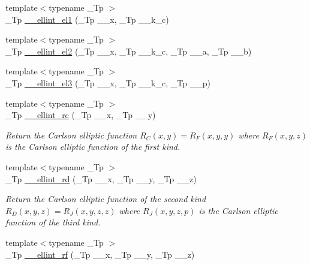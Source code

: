\begin{DoxyCompactItemize}
\item 
{\footnotesize template$<$typename \+\_\+\+Tp $>$ }\\\+\_\+\+Tp \hyperlink{namespacestd_1_1____detail_aa17b1b382a89552f49fbb8c5eda1d50f}{\+\_\+\+\_\+ellint\+\_\+el1} (\+\_\+\+Tp \+\_\+\+\_\+x, \+\_\+\+Tp \+\_\+\+\_\+k\+\_\+c)
\item 
{\footnotesize template$<$typename \+\_\+\+Tp $>$ }\\\+\_\+\+Tp \hyperlink{namespacestd_1_1____detail_a82449d0f05d40ba2cef6b8fc57dd5bae}{\+\_\+\+\_\+ellint\+\_\+el2} (\+\_\+\+Tp \+\_\+\+\_\+x, \+\_\+\+Tp \+\_\+\+\_\+k\+\_\+c, \+\_\+\+Tp \+\_\+\+\_\+a, \+\_\+\+Tp \+\_\+\+\_\+b)
\item 
{\footnotesize template$<$typename \+\_\+\+Tp $>$ }\\\+\_\+\+Tp \hyperlink{namespacestd_1_1____detail_a2a2b5b80edd39b3d1f852f10c5f277fc}{\+\_\+\+\_\+ellint\+\_\+el3} (\+\_\+\+Tp \+\_\+\+\_\+x, \+\_\+\+Tp \+\_\+\+\_\+k\+\_\+c, \+\_\+\+Tp \+\_\+\+\_\+p)
\item 
{\footnotesize template$<$typename \+\_\+\+Tp $>$ }\\\+\_\+\+Tp \hyperlink{namespacestd_1_1____detail_aa7d81e41240a6d031414c6b117889e36}{\+\_\+\+\_\+ellint\+\_\+rc} (\+\_\+\+Tp \+\_\+\+\_\+x, \+\_\+\+Tp \+\_\+\+\_\+y)
\begin{DoxyCompactList}\small\item\em Return the Carlson elliptic function $ R_C(x,y) = R_F(x,y,y) $ where $ R_F(x,y,z) $ is the Carlson elliptic function of the first kind. \end{DoxyCompactList}\item 
{\footnotesize template$<$typename \+\_\+\+Tp $>$ }\\\+\_\+\+Tp \hyperlink{namespacestd_1_1____detail_ac05883415a662fc6f9855dd8d1da921f}{\+\_\+\+\_\+ellint\+\_\+rd} (\+\_\+\+Tp \+\_\+\+\_\+x, \+\_\+\+Tp \+\_\+\+\_\+y, \+\_\+\+Tp \+\_\+\+\_\+z)
\begin{DoxyCompactList}\small\item\em Return the Carlson elliptic function of the second kind $ R_D(x,y,z) = R_J(x,y,z,z) $ where $ R_J(x,y,z,p) $ is the Carlson elliptic function of the third kind. \end{DoxyCompactList}\item 
{\footnotesize template$<$typename \+\_\+\+Tp $>$ }\\\+\_\+\+Tp \hyperlink{namespacestd_1_1____detail_a2cca271dcbdf22923219eab7a02450d5}{\+\_\+\+\_\+ellint\+\_\+rf} (\+\_\+\+Tp \+\_\+\+\_\+x, \+\_\+\+Tp \+\_\+\+\_\+y, \+\_\+\+Tp \+\_\+\+\_\+z)

\end{DoxyCompactItemize}
